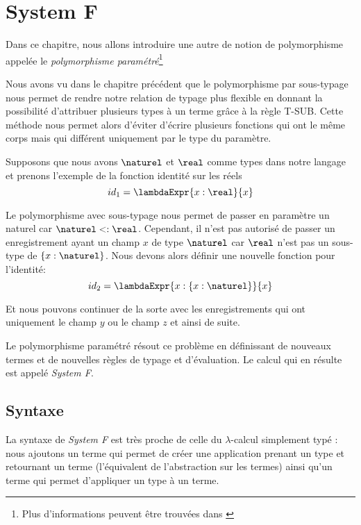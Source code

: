 \chapter{System F}
\label{chapter:system-f}

Dans ce chapitre, nous allons introduire une autre de notion de polymorphisme
appelée le \textit{polymorphisme paramétré}\footnote{Plus d'informations peuvent
être trouvées dans \cite{tapl-system-f}}

Nous avons vu dans le chapitre précédent que le polymorphisme par sous-typage
nous permet de rendre notre relation de typage plus flexible en donnant la
possibilité d'attribuer plusieurs types à un terme grâce à la règle T-SUB. Cette
méthode nous permet alors d'éviter
d'écrire plusieurs fonctions qui ont le même corps mais qui différent uniquement
par le type du paramètre.

Supposons que nous avons $\naturel$ et $\real$ comme types dans notre langage et
prenons l'exemple de la fonction identité sur les réels
\begin{equation*}
  id_{1} = \lambdaExpr{x : \real}{x}
\end{equation*}

Le polymorphisme avec sous-typage nous permet de passer en paramètre un
naturel
car $\naturel <: \real$. Cependant, il n'est pas autorisé de passer un
enregistrement ayant un champ $x$ de type $\naturel$ car $\real$ n'est pas
un sous-type de $\left\{ x : \naturel \right\}$. Nous devons alors définir une
nouvelle fonction pour l'identité:
\begin{equation*}
  id_{2} = \lambdaExpr{x : \left\{ x : \naturel \right\}}{x}
\end{equation*}

Et nous pouvons continuer de la sorte avec les enregistrements qui ont
uniquement le champ $y$ ou le champ $z$ et ainsi de suite.

Le polymorphisme paramétré résout ce problème en définissant de nouveaux termes
et de nouvelles règles de typage et d'évaluation. Le calcul qui en résulte est
appelé \textit{System F}.

\section{Syntaxe}

La syntaxe de \textit{System F} est très proche de celle du $\lambda$-calcul
simplement typé : nous ajoutons un terme qui permet de créer une application
prenant un type et retournant un terme (l'équivalent de l'abstraction sur les
termes) ainsi qu'un terme qui permet d'appliquer un type à un terme.

